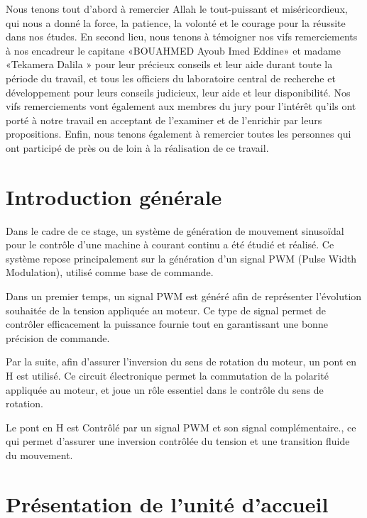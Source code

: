 \documentclass[12pt,a4paper,oneside]{report}
\begin{document}
Nous tenons tout d’abord à remercier Allah le tout-puissant et miséricordieux, qui nous a donné la force, la patience, la volonté et le courage pour la réussite dans nos études. En second lieu, nous tenons à témoigner nos vifs remerciements à nos encadreur le capitane «BOUAHMED Ayoub Imed Eddine» et madame «Tekamera Dalila » pour leur précieux conseils et leur aide durant toute la période du travail, et tous les officiers du laboratoire central de recherche et développement
pour leurs conseils judicieux, leur aide et leur disponibilité. Nos vifs remerciements vont également aux membres du jury pour l’intérêt qu’ils ont porté à notre travail en acceptant de l’examiner et de l’enrichir par leurs propositions. Enfin, nous tenons également à remercier toutes les personnes qui ont participé de près ou de loin à la réalisation de ce travail.








\chapter*{Introduction générale}

Dans le cadre de ce stage, un système de génération de mouvement sinusoïdal pour le contrôle  d'une machine à courant continu a été étudié et réalisé. Ce système repose principalement sur la génération d’un signal PWM (Pulse Width Modulation), utilisé comme base de commande.

Dans un premier temps, un signal PWM est généré afin de représenter l’évolution souhaitée de la tension appliquée au moteur. Ce type de signal permet de contrôler efficacement la puissance fournie tout en garantissant une bonne précision de commande.

Par la suite, afin d’assurer l’inversion du sens de rotation du moteur, un pont en H est utilisé. Ce circuit électronique permet la commutation de la polarité appliquée au moteur, et joue un rôle essentiel dans le contrôle du sens de rotation.

Le pont en H est  Contrôlé par un signal PWM et son signal complémentaire., ce qui permet d’assurer une inversion contrôlée du tension et une transition fluide du mouvement.



\chapter{Présentation de l'unité d'accueil}
\label{chap:presentation_unite}
\end{document}

